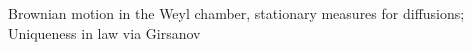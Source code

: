 Brownian motion in the Weyl chamber, stationary measures for diffusions; Uniqueness in law via Girsanov